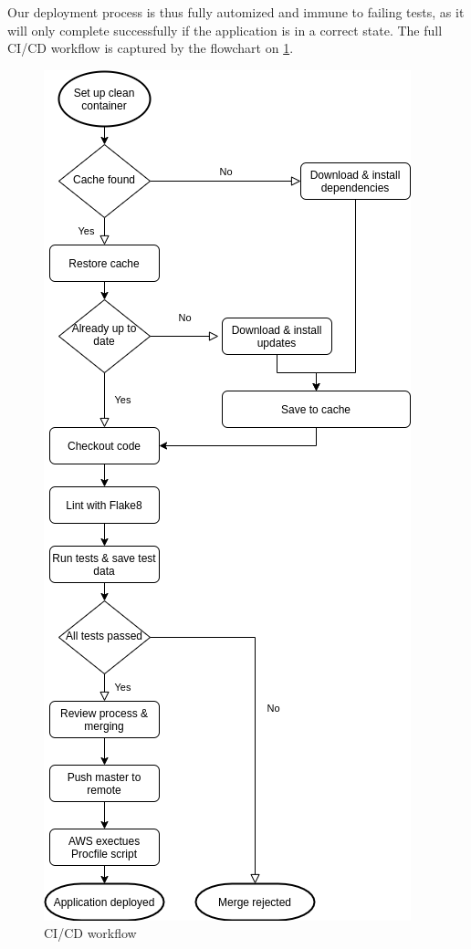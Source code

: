 \documentclass[main.tex]{subfiles}
\begin{document}
Our deployment process is thus fully automized and immune to failing tests, as it will only complete successfully if the application is in a correct state. The full CI/CD workflow is captured by the flowchart on \figurename{\ref{CI_CD}}.

 \begin{figure}[H]
   \centering
   \includegraphics[scale=0.6]{05Coding/05Pictures/CI_CD.png}
   \caption{CI/CD workflow}
   \label{CI_CD}
\end{figure}
\end{document}
